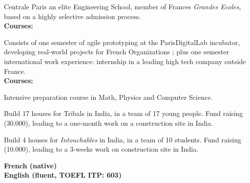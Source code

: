 



\small{Centrale Paris an elite Engineering School, member of France\textquotesingle s \emph{Grandes Ecoles}, based on a highly selective admission process.\\}
{\textbf{Courses:}} \footnotesize{    }

\divider

\small{Consists of one semester of agile prototyping at the ParisDigitalLab incubator, developing real-world projects for French Organizations ; plus one semester international work experience: internship in a leading high tech company outside France.\\}
{\textbf{Courses:}} \footnotesize{  }

\divider

\small{Intensive preparation course in Math, Physics and Computer Science.}

\divider





\small{Build 17 houses for Tribals in India, in a team of 17 young people.
Fund raising (30.000\texteuro), leading to a one-month work on a construction site in India.}

\divider


\small{Build 4 houses for \emph{Intouchables} in India, in a team of 10 students.
Fund raising (10.000\texteuro), leading to a 3-weeks work on construction site in India.}


{\textcolor{emphasis}{\textbf{French (native)\\English (fluent, TOEFL ITP: 603)}}}



